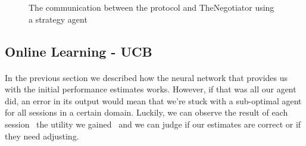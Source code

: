 \documentclass[12pt]{article}
\numberwithin{equation}{section}
\begin{document}
			\begin{figure}[H]
				\centering
				\captionsetup{justification=centering}
				\caption{The communication between the protocol and TheNegotiator using a strategy agent}
				\label{fig:agent-agent_connection}
			\end{figure}


		
		
		\subsection{Online Learning - UCB}		\label{sec:implementation.ucb}

			\paragraph*{}
				In the previous section we described how the neural network that provides us with the initial performance estimates works. However, if that was all our agent did, an error in its output would mean that we're stuck with a sub-optimal agent for all sessions in a certain domain. %
				Luckily, we can observe the result of each session \textendash \ the utility we gained  \textendash \ and we can judge if our estimates are correct or if they need adjusting.
\end{document}
